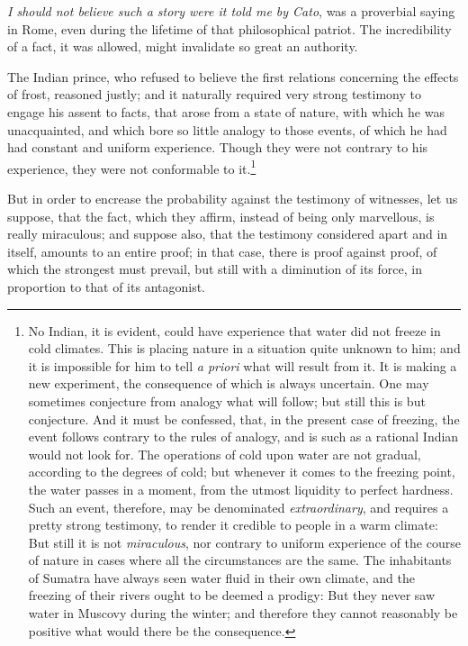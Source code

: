 \documentclass[]{article}
\newcounter{authornote}[page]
\newcommand*{\authornote}[1]{\renewcommand{\thefootnote}{\fnsymbol{footnote}}\stepcounter{authornote}\footnote[\value{authornote}]{#1}\renewcommand{\thefootnote}{\arabic{footnote}}}
\begin{document}
\begin{sectionbody}
\humeparagraph  \emph{I should not believe such a story were it told me by Cato}, was a proverbial saying in Rome, even during the lifetime of that philosophical patriot.%
 The incredibility of a fact, it was allowed, might invalidate so great an authority.

\humeparagraph  The Indian prince, who refused to believe the first relations concerning the effects of frost, reasoned justly; and it naturally required very strong testimony to engage his assent to facts, that arose from a state of nature, with which he was unacquainted, and which bore so little analogy to those events, of which he had had constant and uniform experience. Though they were not contrary to his experience, they were not conformable to it.\authornote{No Indian, it is evident, could have experience that water did not freeze in cold climates. This is placing nature in a situation quite unknown to him; and it is impossible for him to tell \emph{a priori} what will result from it. It is making a new experiment, the consequence of which is always uncertain. One may sometimes conjecture from analogy what will follow; but still this is but conjecture. And it must be confessed, that, in the present case of freezing, the event follows contrary to the rules of analogy, and is such as a rational Indian would not look for. The operations of cold upon water are not gradual, according to the degrees of cold; but whenever it comes to the freezing point, the water passes in a moment, from the utmost liquidity to perfect hardness. Such an event, therefore, may be denominated \emph{extraordinary}, and requires a pretty strong testimony, to render it credible to people in a warm climate: But still it is not \emph{miraculous}, nor contrary to uniform experience of the course of nature in cases where all the circumstances are the same. The inhabitants of Sumatra have always seen water fluid in their own climate, and the freezing of their rivers ought to be deemed a prodigy: But they never saw water in Muscovy during the winter; and therefore they cannot reasonably be positive what would there be the consequence.}

\humeparagraph  But in order to encrease the probability against the testimony of witnesses, let us suppose, that the fact, which they affirm, instead of being only marvellous, is really miraculous; and suppose also, that the testimony considered apart and in itself, amounts to an entire proof; in that case, there is proof against proof, of which the strongest must prevail, but still with a diminution of its force, in proportion to that of its antagonist.


\end{sectionbody}
\end{document}
